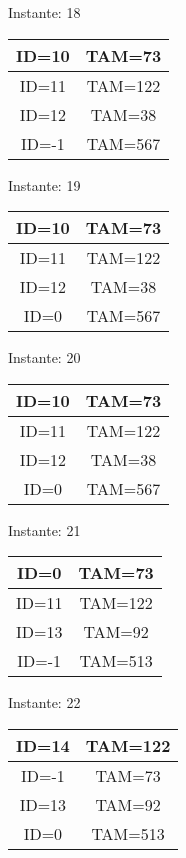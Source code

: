 \documentclass[10pt,a4paper]{article}
\begin{document}
\pagebreak
\begin{center}

Instante: 18

\begin{tabular}{|c|c|}
\hline
ID=10 & TAM=73 \\ \hline
ID=11 & TAM=122 \\ \hline
ID=12 & TAM=38 \\ \hline
ID=-1 & TAM=567 \\ \hline
\end{tabular}
\end{center}\pagebreak
\begin{center}

Instante: 19

\begin{tabular}{|c|c|}
\hline
ID=10 & TAM=73 \\ \hline
ID=11 & TAM=122 \\ \hline
ID=12 & TAM=38 \\ \hline
ID=0 & TAM=567 \\ \hline
\end{tabular}
\end{center}\pagebreak
\begin{center}

Instante: 20

\begin{tabular}{|c|c|}
\hline
ID=10 & TAM=73 \\ \hline
ID=11 & TAM=122 \\ \hline
ID=12 & TAM=38 \\ \hline
ID=0 & TAM=567 \\ \hline
\end{tabular}
\end{center}\pagebreak
\begin{center}

Instante: 21

\begin{tabular}{|c|c|}
\hline
ID=0 & TAM=73 \\ \hline
ID=11 & TAM=122 \\ \hline
ID=13 & TAM=92 \\ \hline
ID=-1 & TAM=513 \\ \hline
\end{tabular}
\end{center}\pagebreak
\begin{center}

Instante: 22

\begin{tabular}{|c|c|}
\hline
ID=14 & TAM=122 \\ \hline
ID=-1 & TAM=73 \\ \hline
ID=13 & TAM=92 \\ \hline
ID=0 & TAM=513 \\ \hline
\end{tabular}
\end{center}\pagebreak
\end{document}
